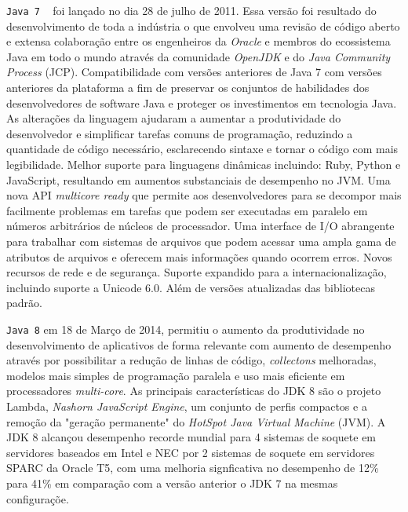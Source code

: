 \texttt{Java 7} ~\cite{JSE7} foi lançado no dia 28 de julho de 2011. Essa vers\~{a}o foi resultado do desenvolvimento de toda a ind\'{u}stria o que envolveu uma revis\~{a}o de c\'{o}digo aberto e extensa colabora\c{c}\~{a}o entre os engenheiros da {\it Oracle} e membros do ecossistema Java em todo o mundo atrav\'{e}s da comunidade {\it OpenJDK} e do {\it Java Community Process} (\acs{JCP}). Compatibilidade com vers\~{o}es anteriores de Java 7 com vers\~{o}es anteriores da plataforma a fim de preservar os conjuntos de habilidades dos desenvolvedores de software Java e proteger os investimentos em tecnologia Java. As altera\c{c}\~{o}es da linguagem ajudaram a aumentar a produtividade do desenvolvedor e simplificar tarefas comuns de programa\c{c}\~{a}o, reduzindo a quantidade de c\'{o}digo necess\'{a}rio, esclarecendo sintaxe e tornar o c\'{o}digo com mais legibilidade. Melhor suporte para linguagens din\^{a}micas incluindo: Ruby, Python e JavaScript, resultando em aumentos substanciais de desempenho no \acs{JVM}. Uma nova API {\it multicore ready} que permite aos desenvolvedores para se decompor mais facilmente problemas em tarefas que podem ser executadas em paralelo em n\'{u}meros arbitr\'{a}rios de n\'{u}cleos de processador. Uma interface de I/O abrangente para trabalhar com sistemas de arquivos que podem acessar uma ampla gama de atributos de arquivos e oferecem mais informaç\~{o}es quando ocorrem erros. Novos recursos de rede e de segurança. Suporte expandido para a internacionaliza\c{c}\~{a}o, incluindo suporte a Unicode 6.0. Al\'{e}m de vers\~{o}es atualizadas das bibliotecas padr\~{a}o.

\texttt{Java 8} em 18 de Março de 2014, permitiu o aumento da produtividade no desenvolvimento de aplicativos de forma relevante com aumento de desempenho atrav\'{e}s por possibilitar a redu\c{c}\~{a}o de linhas de c\'{o}digo, {\it collectons} melhoradas, modelos mais simples de programa\c{c}\~{a}o paralela e uso mais eficiente em processadores {\it multi-core}. As principais caracter\'{i}sticas do \acs{JDK} 8 s\~{a}o o projeto Lambda, {\it Nashorn JavaScript Engine}, um conjunto de perfis compactos e a remo\c{c}\~{a}o da "gera\c{c}\~{a}o permanente" do {\it HotSpot Java Virtual Machine} (\acs{JVM}). A \acs{JDK} 8 alcan\c{c}ou desempenho recorde mundial para 4 sistemas de soquete em servidores baseados em Intel e NEC por 2 sistemas de soquete em servidores SPARC da Oracle T5, com uma melhoria signficativa no desempenho de 12\% para 41\% em compara\c{c}\~{a}o com a vers\~{a}o anterior o JDK 7 na mesmas configura\c{c}\~{o}e.

